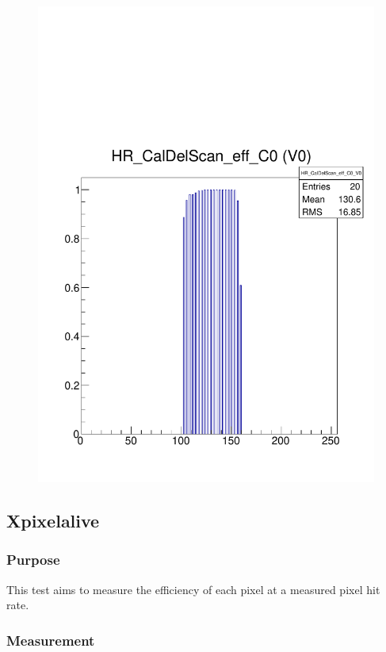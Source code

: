 \documentclass[a4paper,12pt,twoside]{article}
\begin{document}
\begin{figure} [h!]
\begin{minipage}{.48\textwidth}
  \includegraphics[width=\textwidth]{./Figures/CalDel_Efficiency.pdf}
  \label{CalDel-Efficiency}
\end{minipage}
\end{figure}

\subsection{Xpixelalive}

\subsubsection{Purpose}

This test aims to measure the efficiency of each pixel at a measured pixel hit rate.

\subsubsection{Measurement}
\end{document}
